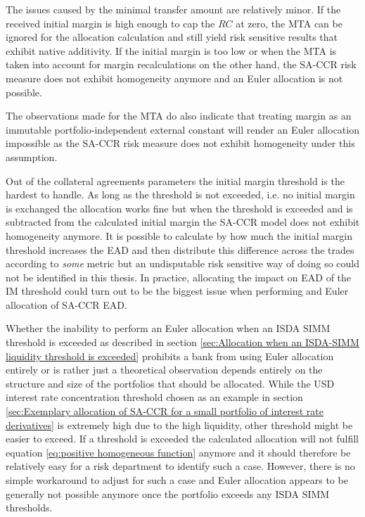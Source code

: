 \documentclass[../Thesis_AHoecherl.tex]{subfiles}
\begin{document}
    The issues caused by the minimal transfer amount are relatively minor.
    If the received initial margin is high enough to cap the $RC$ at zero, the MTA can be ignored for the allocation calculation and still yield risk sensitive results that exhibit native additivity. If the initial margin is too low or when the MTA is taken into account for margin recalculations on the other hand, the SA-CCR risk measure does not exhibit homogeneity anymore and an Euler allocation is not possible.
    
    The observations made for the MTA do also indicate that treating margin as an immutable portfolio-independent external constant will render an Euler allocation impossible as the SA-CCR risk measure does not exhibit homogeneity under this assumption.


    Out of the collateral agreements parameters the initial margin threshold is the hardest to handle. As long as the threshold is not exceeded, i.e. no initial margin is exchanged the allocation works fine but when the threshold is exceeded and is subtracted from the calculated initial margin the SA-CCR model does not exhibit homogeneity anymore.
    It is possible to calculate by how much the initial margin threshold increases the EAD and then distribute this difference across the trades according to \emph{some} metric but an undisputable risk sensitive way of doing so could not be identified in this thesis.
    In practice, allocating the impact on EAD of the IM threshold could turn out to be the biggest issue when performing and Euler allocation of SA-CCR EAD.

    Whether the inability to perform an Euler allocation when an ISDA SIMM threshold is exceeded as described in section \ref{sec:Allocation when an ISDA-SIMM liquidity threshold is exceeded} prohibits a bank from using Euler allocation entirely or is rather just a theoretical observation depends entirely on the structure and size of the portfolios that should be allocated.
    While the USD interest rate concentration threshold chosen as an example in section \ref{sec:Exemplary allocation of SA-CCR for a small portfolio of interest rate derivatives} is extremely high due to the high liquidity, other threshold might be easier to exceed. If a threshold is exceeded the calculated allocation will not fulfill equation \ref{eq:positive homogeneous function} anymore and it should therefore be relatively easy for a risk department to identify such a case. However, there is no simple workaround to adjust for such a case and Euler allocation appears to be generally not possible anymore once the portfolio exceeds any ISDA SIMM thresholds.
\end{document}
